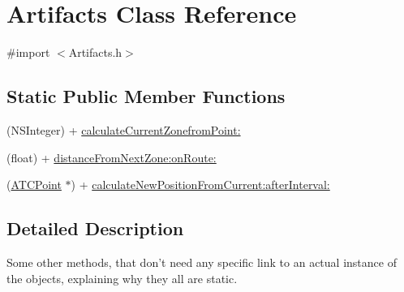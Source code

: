 \hypertarget{interface_artifacts}{
\section{\-Artifacts \-Class \-Reference}
\label{interface_artifacts}
}


{\ttfamily \#import $<$\-Artifacts.\-h$>$}

\subsection*{\-Static \-Public \-Member \-Functions}
\begin{DoxyCompactItemize}
\item 
(\-N\-S\-Integer) + \hyperlink{interface_artifacts_adb7b265d6d1054e7a0be864cdead1bb9}{calculate\-Current\-Zonefrom\-Point\-:}
\item 
(float) + \hyperlink{interface_artifacts_a5e4d3c0531320bde6dd9e835cc80eb18}{distance\-From\-Next\-Zone\-:on\-Route\-:}
\item 
(\hyperlink{interface_a_t_c_point}{\-A\-T\-C\-Point} $\ast$) + \hyperlink{interface_artifacts_aa2daaa0b9218e87908111a2e6951b9cf}{calculate\-New\-Position\-From\-Current\-:after\-Interval\-:}
\end{DoxyCompactItemize}


\subsection{\-Detailed \-Description}
\-Some other methods, that don't need any specific link to an actual instance of the objects, explaining why they all are static. 


